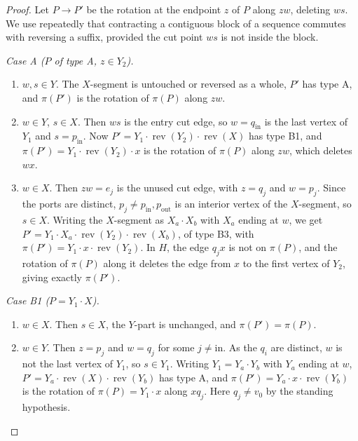 \documentclass[11pt]{article}
\theoremstyle{definition}
\newcommand{\rev}{\operatorname{rev}}
\newcommand{\inn}{\mathrm{in}}
\begin{document}
\begin{proof}
Let $P \to P'$ be the rotation at the endpoint $z$ of $P$ along $zw$, deleting $ws$. We use
repeatedly that contracting a contiguous block of a sequence commutes with reversing a suffix,
provided the cut point $ws$ is not inside the block.

\emph{Case A ($P$ of type A, $z \in Y_2$).}
\begin{enumerate}
\item[(i)] $w, s \in Y$. The $X$-segment is untouched or reversed as a whole, $P'$ has type A, and
$\pi(P')$ is the rotation of $\pi(P)$ along $zw$.
\item[(ii)] $w \in Y$, $s \in X$. Then $ws$ is the entry cut edge, so $w = q_\inn$ is the last
vertex of $Y_1$ and $s = p_\inn$. Now $P' = Y_1 \cdot \rev(Y_2) \cdot \rev(X)$ has type B1, and
$\pi(P') = Y_1 \cdot \rev(Y_2) \cdot x$ is the rotation of $\pi(P)$ along $zw$, which deletes $wx$.
\item[(iii)] $w \in X$. Then $zw = e_j$ is the unused cut edge, with $z = q_j$ and $w = p_j$. Since
the ports are distinct, $p_j \ne p_\inn, p_{\mathrm{out}}$ is an interior vertex of the
$X$-segment, so $s \in X$. Writing the $X$-segment as $X_a \cdot X_b$ with $X_a$ ending at $w$, we
get $P' = Y_1 \cdot X_a \cdot \rev(Y_2) \cdot \rev(X_b)$, of type B3, with
$\pi(P') = Y_1 \cdot x \cdot \rev(Y_2)$. In $H$, the edge $q_jx$ is not on $\pi(P)$, and the
rotation of $\pi(P)$ along it deletes the edge from $x$ to the first vertex of $Y_2$, giving
exactly $\pi(P')$.
\end{enumerate}

\emph{Case B1 ($P = Y_1 \cdot X$).}
\begin{enumerate}
\item[(i)] $w \in X$. Then $s \in X$, the $Y$-part is unchanged, and $\pi(P') = \pi(P)$.
\item[(ii)] $w \in Y$. Then $z = p_j$ and $w = q_j$ for some $j \ne \inn$. As the $q_i$ are
distinct, $w$ is not the last vertex of $Y_1$, so $s \in Y_1$. Writing $Y_1 = Y_a \cdot Y_b$ with
$Y_a$ ending at $w$, $P' = Y_a \cdot \rev(X) \cdot \rev(Y_b)$ has type A, and
$\pi(P') = Y_a \cdot x \cdot \rev(Y_b)$ is the rotation of $\pi(P) = Y_1 \cdot x$ along $xq_j$. Here
$q_j \ne v_0$ by the standing hypothesis.
\end{enumerate}


\end{proof}
\end{document}
